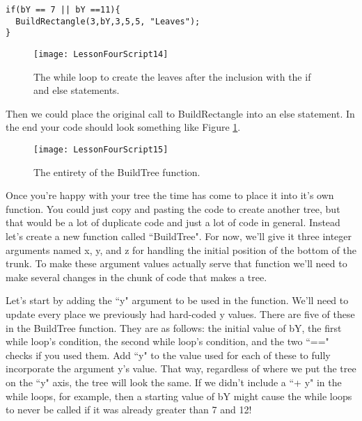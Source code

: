 \documentclass{article}
\begin{document}
\lstset{style=sharpc}
\begin{lstlisting}
if(bY == 7 || bY ==11){
  BuildRectangle(3,bY,3,5,5, "Leaves");
}
\end{lstlisting} 
\begin{figure}
  \texttt{[image: LessonFourScript14]}
  \caption{The while loop to create the leaves after the inclusion with the if and else statements.}
  \label{fig:LessonFourScript14}
\end{figure}

Then we could place the original call to BuildRectangle into an else statement. In the end your code should look something like Figure \ref{fig:LessonFourScript14}. 

\noindent{}

\begin{figure}
  \texttt{[image: LessonFourScript15]}
  \caption{The entirety of the BuildTree function.}
  \label{fig:LessonFourScript15}
\end{figure}

Once you're happy with your tree the time has come to place it into it's own function. You could just copy and pasting the code to create another tree, but that would be a lot of duplicate code and just a lot of code in general. Instead let's create a new function called ``BuildTree". For now, we'll give it three integer arguments named x, y, and z for handling the initial position of the bottom of the trunk. To make these argument values actually serve that function we'll need to make several changes in the chunk of code that makes a tree. 

Let's start by adding the ``y" argument to be used in the function. We'll need to update every place we previously had hard-coded y values. There are five of these in the BuildTree function. They are as follows: the initial value of bY, the first while loop's condition, the second while loop's condition, and the two ``==" checks if you used them. Add ``y" to the value used for each of these to fully incorporate the argument y's value. That way, regardless of where we put the tree on the ``y" axis, the tree will look the same. If we didn't include a ``+ y" in the while loops, for example, then a starting value of bY might cause the while loops to never be called if it was already greater than 7 and 12!
\end{document}
